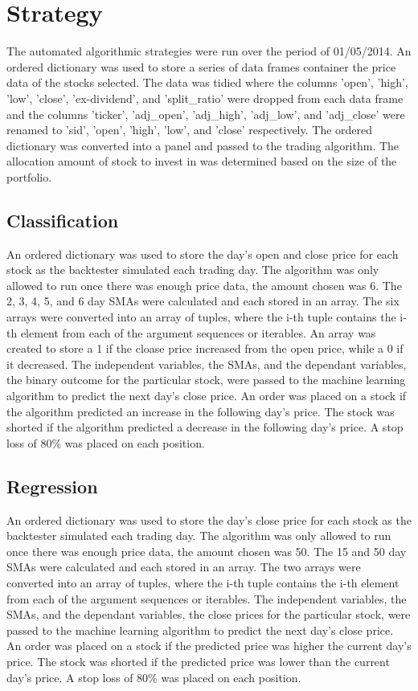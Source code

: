 \section{Strategy}
The automated algorithmic strategies were run over the period of 01/05/2014. An ordered dictionary was used to store a series of data frames container the price data of the stocks selected. The data was tidied where the columns 'open', 'high', 'low', 'close', 'ex-dividend', and 'split\_ratio' were dropped from each data frame and the columns 'ticker', 'adj\_open', 'adj\_high', 'adj\_low', and 'adj\_close' were renamed to 'sid', 'open', 'high', 'low', and 'close' respectively. The ordered dictionary was converted into a panel and passed to the trading algorithm. The allocation amount of stock to invest in was determined based on the size of the portfolio. 

\subsection{Classification}
An ordered dictionary was used to store the day's open and close price for each stock as the backtester simulated each trading day. The algorithm was only allowed to run once there was enough price data, the amount chosen was 6. The 2, 3, 4, 5, and 6 day SMAs were calculated and each stored in an array. The six arrays were converted into an array of tuples, where the i-th tuple contains the i-th element from each of the argument sequences or iterables. An array was created to store a 1 if the cloase price increased from the open price, while a 0 if it decreased. The independent variables, the SMAs, and the dependant variables, the binary outcome for the particular stock, were passed to the machine learning algorithm to predict the next day's close price. An order was placed on a stock if the algorithm predicted an increase in the following day's price. The stock was shorted if the algorithm predicted a decrease in the following day's price. A stop loss of 80\% was placed on each position.

\subsection{Regression}
An ordered dictionary was used to store the day's close price for each stock as the backtester simulated each trading day. The algorithm was only allowed to run once there was enough price data, the amount chosen was 50. The 15 and 50 day SMAs were calculated and each stored in an array. The two arrays were converted into an array of tuples, where the i-th tuple contains the i-th element from each of the argument sequences or iterables. The independent variables, the SMAs, and the dependant variables, the close prices for the particular stock, were passed to the machine learning algorithm to predict the next day's close price. An order was placed on a stock if the predicted price was higher the current day's price. The stock was shorted if the predicted price was lower than the current day's price. A stop loss of 80\% was placed on each position.